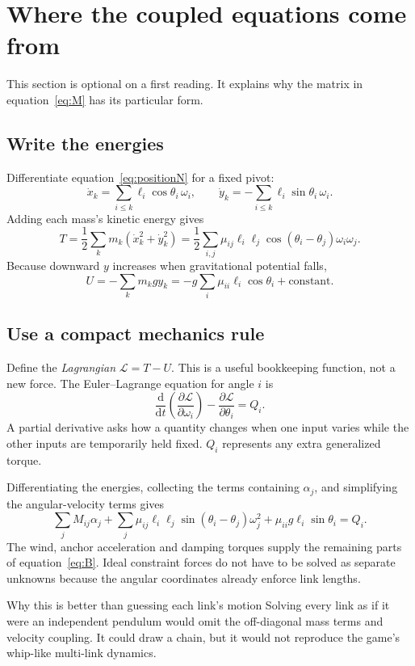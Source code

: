 \documentclass[11pt,a4paper]{article}
\newcommand{\dd}{\mathrm{d}}\newcommand{\vect}[1]{\boldsymbol{#1}}
\begin{document}
\section{Where the coupled equations come from}
This section is optional on a first reading. It explains why the matrix in equation~\eqref{eq:M} has its particular form.
\subsection{Write the energies}
Differentiate equation~\eqref{eq:positionN} for a fixed pivot:
\[
 \dot x_k=\sum_{i\leq k}\ell_i\cos\theta_i\,\omega_i,\qquad
 \dot y_k=-\sum_{i\leq k}\ell_i\sin\theta_i\,\omega_i.
\]
Adding each mass's kinetic energy gives
\begin{equation}\label{eq:T}
 T=\frac12\sum_k m_k(\dot x_k^2+\dot y_k^2)
 =\frac12\sum_{i,j}\mu_{ij}\ell_i\ell_j\cos(\theta_i-\theta_j)\omega_i\omega_j.
\end{equation}
Because downward \(y\) increases when gravitational potential falls,
\[
 U=-\sum_k m_kg y_k=-g\sum_i\mu_{ii}\ell_i\cos\theta_i+\text{constant}.
\]
\subsection{Use a compact mechanics rule}
Define the \emph{Lagrangian} \(\mathcal L=T-U\). This is a useful bookkeeping function, not a new force. The Euler--Lagrange equation for angle \(i\) is
\[
 \frac{\dd}{\dd t}\left(\frac{\partial\mathcal L}{\partial\omega_i}\right)
 -\frac{\partial\mathcal L}{\partial\theta_i}=Q_i.
\]
A partial derivative asks how a quantity changes when one input varies while the other inputs are temporarily held fixed. \(Q_i\) represents any extra generalized torque.

Differentiating the energies, collecting the terms containing \(\alpha_j\), and simplifying the angular-velocity terms gives
\[
 \sum_j M_{ij}\alpha_j+
 \sum_j\mu_{ij}\ell_i\ell_j\sin(\theta_i-\theta_j)\omega_j^2
 +\mu_{ii}g\ell_i\sin\theta_i=Q_i.
\]
The wind, anchor acceleration and damping torques supply the remaining parts of equation~\eqref{eq:B}. Ideal constraint forces do not have to be solved as separate unknowns because the angular coordinates already enforce link lengths.
\begin{idea}{Why this is better than guessing each link's motion}
Solving every link as if it were an independent pendulum would omit the off-diagonal mass terms and velocity coupling. It could draw a chain, but it would not reproduce the game's whip-like multi-link dynamics.
\end{idea}
\end{document}
